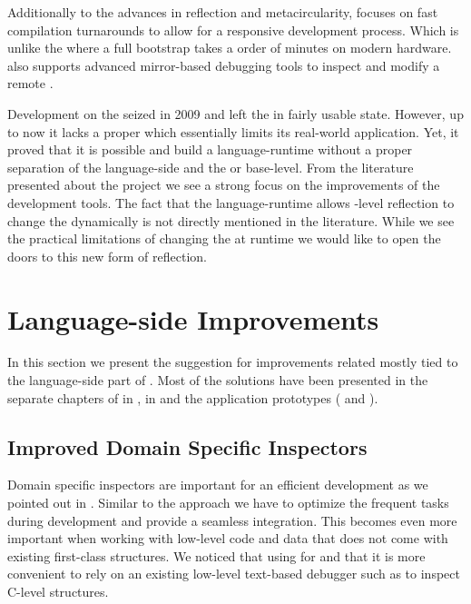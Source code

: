 Additionally to the advances in reflection and metacircularity, \Klein focuses on fast compilation turnarounds to allow for a responsive development process.
Which is unlike the \Squeak \VM where a full \VM bootstrap takes a order of minutes on modern hardware.
\Klein also supports advanced mirror-based debugging tools to inspect and modify a remote \VM.

Development on the \Klein \VM seized in 2009 and left the \Klein \VM in fairly usable state.
However, up to now it lacks a proper \GC which essentially limits its real-world application.
Yet, it proved that it is possible and build a language-runtime without a proper separation of the language-side and the \VM or base-level.
From the literature presented about the \Klein project we see a strong focus on the improvements of the development tools.
The fact that the language-runtime allows \VM-level reflection to change the \VM dynamically is not directly mentioned in the literature.
While we see the practical limitations of changing the \VM at runtime we would like to open the doors to this new form of reflection.



\section{Language-side Improvements}
In this section we present the suggestion for improvements related mostly tied to the language-side part of \B.
Most of the solutions have been presented in the separate chapters of \B in , \NB \FFI in  and the \B application prototypes ( and ).

\subsection{Improved Domain Specific Inspectors}
Domain specific inspectors are important for an efficient development as we pointed out in .
Similar to the \JIT approach we have to optimize the frequent tasks during development and provide a seamless integration.
This becomes even more important when working with low-level code and data that does not come with existing first-class structures.
We noticed that using \B for \NBJ and \WF that it is more convenient to rely on an existing low-level text-based debugger such as  to inspect C-level structures.

